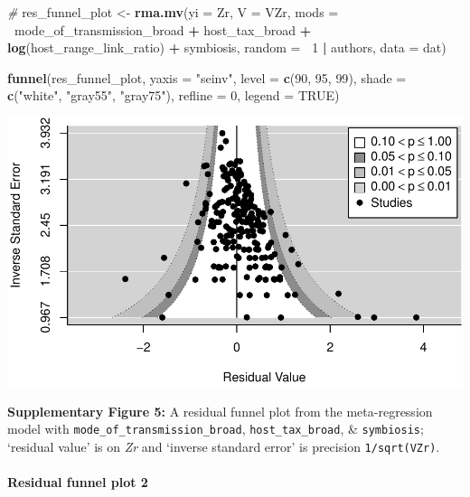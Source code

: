 \documentclass[
]{article}
\newenvironment{Shaded}{\begin{snugshade}}{\end{snugshade}}
\newcommand{\CommentTok}[1]{\textcolor[rgb]{0.56,0.35,0.01}{\textit{#1}}}
\newcommand{\DataTypeTok}[1]{\textcolor[rgb]{0.13,0.29,0.53}{#1}}
\newcommand{\DecValTok}[1]{\textcolor[rgb]{0.00,0.00,0.81}{#1}}
\newcommand{\KeywordTok}[1]{\textcolor[rgb]{0.13,0.29,0.53}{\textbf{#1}}}
\newcommand{\NormalTok}[1]{#1}
\newcommand{\OperatorTok}[1]{\textcolor[rgb]{0.81,0.36,0.00}{\textbf{#1}}}
\newcommand{\OtherTok}[1]{\textcolor[rgb]{0.56,0.35,0.01}{#1}}
\newcommand{\StringTok}[1]{\textcolor[rgb]{0.31,0.60,0.02}{#1}}
\begin{document}
\begin{Shaded}
\begin{Highlighting}[]
\CommentTok{# }
\NormalTok{res_funnel_plot <-}\StringTok{ }\KeywordTok{rma.mv}\NormalTok{(}\DataTypeTok{yi =}\NormalTok{ Zr, }\DataTypeTok{V =}\NormalTok{ VZr, }\DataTypeTok{mods =} \OperatorTok{~}\NormalTok{mode_of_transmission_broad }\OperatorTok{+}\StringTok{ }
\StringTok{    }\NormalTok{host_tax_broad }\OperatorTok{+}\StringTok{ }\KeywordTok{log}\NormalTok{(host_range_link_ratio) }\OperatorTok{+}\StringTok{ }\NormalTok{symbiosis, }\DataTypeTok{random =} \OperatorTok{~}\DecValTok{1} \OperatorTok{|}\StringTok{ }\NormalTok{authors, }
    \DataTypeTok{data =}\NormalTok{ dat)}

\KeywordTok{funnel}\NormalTok{(res_funnel_plot, }\DataTypeTok{yaxis =} \StringTok{"seinv"}\NormalTok{, }\DataTypeTok{level =} \KeywordTok{c}\NormalTok{(}\DecValTok{90}\NormalTok{, }\DecValTok{95}\NormalTok{, }\DecValTok{99}\NormalTok{), }\DataTypeTok{shade =} \KeywordTok{c}\NormalTok{(}\StringTok{"white"}\NormalTok{, }
    \StringTok{"gray55"}\NormalTok{, }\StringTok{"gray75"}\NormalTok{), }\DataTypeTok{refline =} \DecValTok{0}\NormalTok{, }\DataTypeTok{legend =} \OtherTok{TRUE}\NormalTok{)}
\end{Highlighting}
\end{Shaded}

\includegraphics{Supporting_Information_files/figure-latex/unnamed-chunk-51-1.pdf}

\textbf{Supplementary Figure 5:} A residual funnel plot from the
meta-regression model with \texttt{mode\_of\_transmission\_broad},
\texttt{host\_tax\_broad}, \& \texttt{symbiosis}; `residual value' is on
\emph{Zr} and `inverse standard error' is precision
\texttt{1/sqrt(VZr)}.

\hypertarget{residual-funnel-plot-2}{%
\paragraph{Residual funnel plot 2}\label{residual-funnel-plot-2}}
\end{document}
